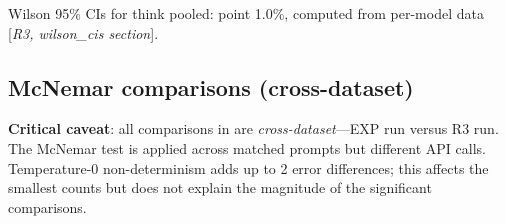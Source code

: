\documentclass[11pt,a4paper]{article}
\begin{document}
\noindent Wilson 95\% CIs for \textsf{think} pooled: point 1.0\%,
computed from per-model data [\emph{R3, wilson\_cis section}].

\subsection{McNemar comparisons (cross-dataset)}

\textbf{Critical caveat}: all comparisons in  are
\emph{cross-dataset}---EXP run versus R3 run.  The McNemar test is applied
across matched prompts but different API calls.  Temperature-0
non-determinism adds up to 2 error differences; this affects the
smallest counts but does not explain the magnitude of the significant
comparisons.

\begin{table}[htbp]
\centering
\caption{Cross-dataset McNemar comparisons: EXP variants vs.\ R3
  \textsf{think}.  All 4 models, pooled across 200 effective traps per
  model (800 total observations).
  \textbf{Cross-dataset}: EXP run vs.\ R3 run, same prompts.
  [\emph{Source: R3 = calculations-r3.json, mcnemar\_vs\_exp section}]}
\label{tab:r3_mcnemar}
\smallskip
{}
\end{table}
\end{document}
